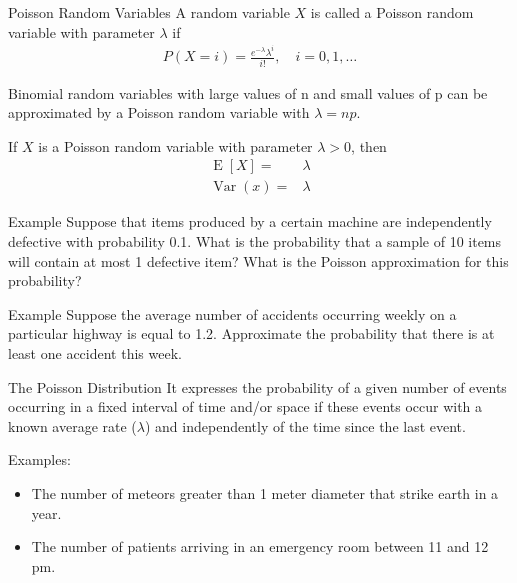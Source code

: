 \documentclass{beamer}
\newcommand{\E}{\operatorname{E}}
\newcommand{\Var}{\operatorname{Var}}
\begin{document}
\begin{frame}{Poisson Random Variables}
  A random variable $X$ is called a \alert{Poisson} random variable with
  parameter $\lambda$ if
  \begin{align*}
    P(X=i) = \frac{e^{-\lambda}\lambda^i}{i!},\quad i=0,1,\ldots
  \end{align*}

  Binomial random variables with large values of n and small values of p can be
  approximated by a Poisson random variable with $\lambda=np$.

  If $X$ is a Poisson random variable with parameter $\lambda > 0$, then
  \begin{align*}
    \E[X] =& \lambda\\
    \Var(x) =& \lambda
  \end{align*}

\end{frame}

\begin{frame}[t]{Example}
  Suppose that items produced by a certain machine are independently defective
  with probability 0.1. What is the probability that a sample of 10 items will
  contain at most 1 defective item? What is the Poisson approximation for this
  probability?
\end{frame}

\begin{frame}[t]{Example}
  Suppose the average number of accidents occurring weekly on a particular
  highway is equal to 1.2. Approximate the probability that there is at least one
  accident this week.
\end{frame}

\begin{frame}{The Poisson Distribution}
  It expresses the probability of a given number of events occurring in a fixed
  interval of time and/or space if these events occur with a known average rate
  ($\lambda$) and \alert{independently} of the time since the last event.

  Examples:
  \begin{itemize}
  \item The number of meteors greater than 1 meter diameter that strike earth in
    a year.
  \item The number of patients arriving in an emergency room between 11 and 12 pm.
  \end{itemize}
\end{frame}
\end{document}

